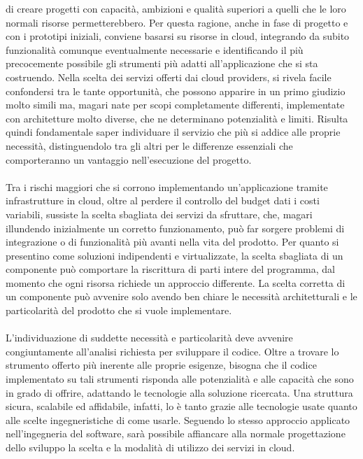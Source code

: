 di creare progetti con capacità, ambizioni e qualità superiori a quelli che le loro normali risorse permetterebbero.
Per questa ragione, anche in fase di progetto e con i prototipi iniziali, conviene basarsi su risorse in cloud, 
integrando da subito funzionalità comunque eventualmente necessarie e 
identificando il più precocemente possibile gli strumenti più adatti all'applicazione che si sta costruendo.
Nella scelta dei servizi offerti dai cloud providers, si rivela facile confondersi tra le tante opportunità, 
che possono apparire in un primo giudizio molto simili ma, magari nate per scopi completamente differenti, 
implementate con architetture molto diverse, che ne determinano potenzialità e limiti.
Risulta quindi fondamentale saper individuare il servizio che più si addice alle proprie necessità, 
distinguendolo tra gli altri per le differenze essenziali che comporteranno un vantaggio nell'esecuzione del progetto.\\
\\
Tra i rischi maggiori che si corrono implementando un'applicazione tramite infrastrutture in cloud,
oltre al perdere il controllo del budget dati i costi variabili, sussiste la scelta sbagliata dei servizi da sfruttare, che, 
magari illundendo inizialmente un corretto funzionamento, può far sorgere problemi di integrazione o di funzionalità 
più avanti nella vita del prodotto.
Per quanto si presentino come soluzioni indipendenti e virtualizzate, 
la scelta sbagliata di un componente può comportare la riscrittura di parti intere del programma,
dal momento che ogni risorsa richiede un approccio differente.
La scelta corretta di un componente può avvenire solo avendo ben chiare le necessità architetturali e le particolarità del prodotto che si vuole implementare.\\
\\
L'individuazione di suddette necessità e particolarità deve avvenire congiuntamente all'analisi richiesta per sviluppare il codice.
Oltre a trovare lo strumento offerto più inerente alle proprie esigenze, 
bisogna che il codice implementato su tali strumenti risponda alle potenzialità e alle capacità che sono in grado di offrire, 
adattando le tecnologie alla soluzione ricercata.
Una struttura sicura, scalabile ed affidabile, infatti, lo è tanto grazie alle tecnologie usate quanto alle scelte ingegneristiche di come usarle.
Seguendo lo stesso approccio applicato nell'ingegneria del software, sarà possibile affiancare alla normale progettazione dello sviluppo 
la scelta e la modalità di utilizzo dei servizi in cloud.\\
